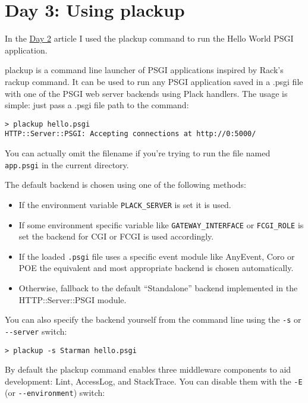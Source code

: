 \section{Day 3: Using plackup}\label{day-3-using-plackup}

In the
\href{http://advent.plackperl.org/2009/12/day-2-hello-world.html}{Day 2}
article I used the plackup command to run the Hello World PSGI
application.

plackup is a command line launcher of PSGI applications inspired by
Rack's rackup command. It can be used to run any PSGI application saved
in a .psgi file with one of the PSGI web server backends using Plack
handlers. The usage is simple: just pass a .psgi file path to the
command:

\begin{lstlisting}
> plackup hello.psgi
HTTP::Server::PSGI: Accepting connections at http://0:5000/
\end{lstlisting}

You can actually omit the filename if you're trying to run the file
named \lstinline!app.psgi! in the current directory.

The default backend is chosen using one of the following methods:

\begin{itemize}
\itemsep1pt\parskip0pt
\item
  If the environment variable \lstinline!PLACK_SERVER! is set it is
  used.
\item
  If some environment specific variable like
  \lstinline!GATEWAY_INTERFACE! or \lstinline!FCGI_ROLE! is set the
  backend for CGI or FCGI is used accordingly.
\item
  If the loaded \lstinline!.psgi! file uses a specific event module like
  AnyEvent, Coro or POE the equivalent and most appropriate backend is
  chosen automatically.
\item
  Otherwise, fallback to the default ``Standalone'' backend implemented
  in the HTTP::Server::PSGI module.
\end{itemize}

You can also specify the backend yourself from the command line using
the \lstinline!-s! or \lstinline!--server! switch:

\begin{lstlisting}
> plackup -s Starman hello.psgi
\end{lstlisting}

By default the plackup command enables three middleware components to
aid development: Lint, AccessLog, and StackTrace. You can disable them
with the \lstinline!-E! (or \lstinline!--environment!) switch:

